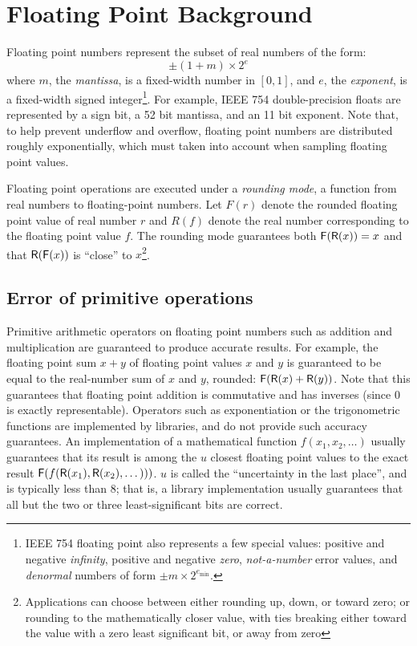 \documentclass[paper.tex]{subfiles}
\begin{document}

\section{Floating Point Background}
\label{sec:background}

Floating point numbers represent the subset of real numbers of the
form:
\[ \pm (1 + m) \times 2^e \]%
where $m$, the \emph{mantissa}, is a fixed-width number in $[0, 1]$,
and $e$, the \emph{exponent}, is a fixed-width signed
integer\footnote{IEEE 754 floating point also represents a few special
  values: positive and negative \emph{infinity}, positive and negative
  \emph{zero}, \emph{not-a-number} error values, and \emph{denormal}
  numbers of form $\pm m \times 2^{e_{\text{min}}}$.}.  For example,
IEEE 754 double-precision floats are represented by a sign bit, a 52
bit mantissa, and an 11 bit exponent.  Note that, to help prevent
underflow and overflow, floating point numbers are distributed roughly
exponentially, which must taken into account when sampling floating
point values.

Floating point operations are executed under a \textit{rounding mode},
a function from real numbers to floating-point numbers. Let $F(r)$
denote the rounded floating point value of real number $r$ and $R(f)$
denote the real number corresponding to the floating point value
$f$. The rounding mode guarantees both $\mathsf{F}(\mathsf{R}(x)) = x$ and that
$\mathsf{R}(\mathsf{F}(x))$ is ``close'' to $x$\footnote{Applications can choose
  between either rounding up, down, or toward zero; or rounding to the
  mathematically closer value, with ties breaking either toward the
  value with a zero least significant bit, or away from zero}.

\subsection{Error of primitive operations}

Primitive arithmetic operators on floating point numbers such as
addition and multiplication are guaranteed to produce accurate
results.  For example, the floating point sum $x + y$ of floating
point values $x$ and $y$ is guaranteed to be equal to the real-number
sum of $x$ and $y$, rounded: $\mathsf{F}(\mathsf{R}(x) + \mathsf{R}(y))$.  Note that this
guarantees that floating point addition is commutative and has
inverses (since $0$ is exactly representable).  Operators such as
exponentiation or the trigonometric functions are implemented by
libraries, and do not provide such accuracy guarantees.  An
implementation of a mathematical function $f(x_1, x_2, \dotsc)$
usually guarantees that its result is among the $u$ closest floating
point values to the exact result $\mathsf{F}(f(\mathsf{R}(x_1), \mathsf{R}(x_2), \dotsc)))$.
$u$ is called the ``uncertainty in the last place'', and is typically
less than 8; that is, a library implementation usually guarantees that
all but the two or three least-significant bits are correct.
\end{document}

